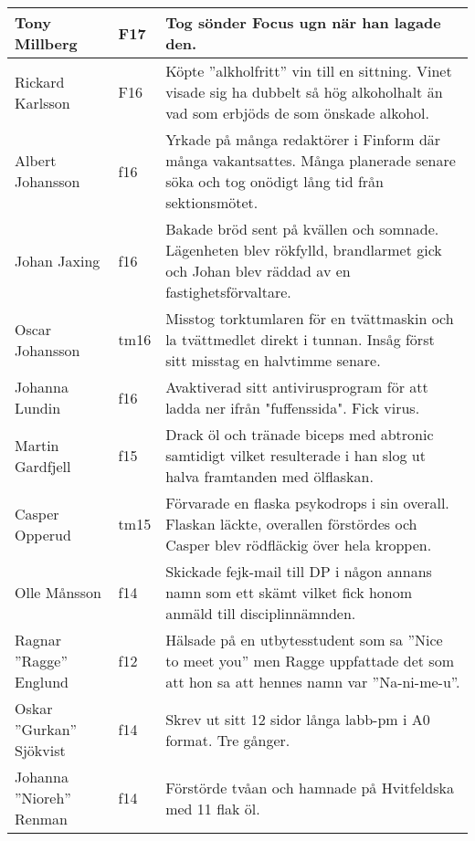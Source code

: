 \begin{longtable}{p{55mm}lp{60mm}}
  Tony Millberg & F17 & Tog sönder Focus ugn när han lagade den. \\ \hline

  Rickard Karlsson & F16 & Köpte ''alkholfritt'' vin till en sittning. Vinet visade sig ha dubbelt så hög alkoholhalt än vad som erbjöds de som önskade alkohol. \\ \hline
  
  Albert Johansson & f16 & Yrkade på många redaktörer i Finform där många vakantsattes. Många planerade senare söka och tog onödigt lång tid från sektionsmötet. \\ \hline 
  
  Johan Jaxing & f16 & Bakade bröd sent på kvällen och somnade. Lägenheten blev rökfylld, brandlarmet gick och Johan blev räddad av en fastighetsförvaltare. \\ \hline

  Oscar Johansson & tm16 & Misstog torktumlaren för en tvättmaskin och la tvättmedlet direkt i tunnan. Insåg först sitt misstag en halvtimme senare.\\ \hline

  Johanna Lundin & f16 & Avaktiverad sitt antivirusprogram för att ladda ner ifrån "fuffenssida". Fick virus. \\ \hline

  Martin Gardfjell & f15 & Drack öl och tränade biceps med abtronic samtidigt vilket resulterade i han slog ut halva framtanden med ölflaskan.\\ \hline

  Casper Opperud & tm15 & Förvarade en flaska psykodrops i sin overall. Flaskan läckte, overallen förstördes och Casper blev rödfläckig över hela kroppen.\\ \hline

  Olle Månsson & f14 & Skickade fejk-mail till DP i någon annans namn som ett skämt vilket fick honom anmäld till disciplinnämnden.\\ \hline

  Ragnar ''Ragge'' Englund & f12 & Hälsade på en utbytesstudent som sa ''Nice to meet you'' men Ragge uppfattade det som att hon sa att hennes namn var ''Na-ni-me-u''.\\ \hline

  Oskar ''Gurkan'' Sjökvist & f14 & Skrev ut sitt 12 sidor långa labb-pm i A0 format. Tre gånger.\\ \hline

  Johanna ''Nioreh'' Renman & f14 & Förstörde tvåan och hamnade på Hvitfeldska med 11 flak öl. \\ \hline 


\end{longtable}
